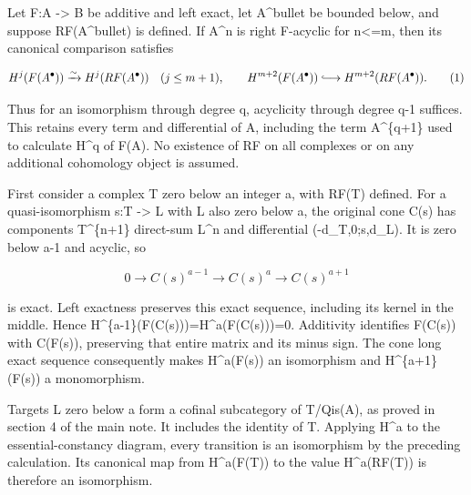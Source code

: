 \documentclass[11pt]{article}
\begin{document}
Let F:\allowbreak{}A \allowbreak{}-> B be additive and left exact,\allowbreak{} let A\^{}bullet be bounded below,\allowbreak{} and suppose RF(A\textasciicircum{}bullet)\allowbreak{} is defined. If A\^{}n is right F-acyclic for n<\allowbreak{}=m,\allowbreak{} then its canonical comparison satisfies

\[
 H^j(F(A^\bullet))\xrightarrow{\sim}H^j(RF(A^\bullet))
       \quad(j\le m+1),
 \qquad
 H^{m+2}(F(A^\bullet))\lhook\joinrel\longrightarrow
                                  H^{m+2}(RF(A^\bullet)).       \tag{1}
\]

Thus for an isomorphism through degree q,\allowbreak{} acyclicity through degree q-1 suffices. This retains every term and differential of A,\allowbreak{} including the term A\textasciicircum{}\{q\allowbreak{}+1\} used to calculate H\^{}q of F(A)\allowbreak{}. No existence of RF on all complexes or on any additional cohomology object is assumed.

First consider a complex T zero below an integer a,\allowbreak{} with RF(T)\allowbreak{} defined. For a quasi-isomorphism s:\allowbreak{}T \allowbreak{}-> L with L also zero below a,\allowbreak{} the original cone C(s)\allowbreak{} has components T\textasciicircum{}\{n\allowbreak{}+1\} direct-sum L\^{}n and differential (-d\_\allowbreak{}T,\allowbreak{}0;s,\allowbreak{}d\_\allowbreak{}L)\allowbreak{}. It is zero below a-1 and acyclic,\allowbreak{} so

\[
 0\longrightarrow C(s)^{a-1}\longrightarrow C(s)^a
                         \longrightarrow C(s)^{a+1}
\]

is exact. Left exactness preserves this exact sequence,\allowbreak{} including its kernel in the middle. Hence H\textasciicircum{}\{a-1\}(F(C(s)\allowbreak{})\allowbreak{})\allowbreak{}\allowbreak{}=H\textasciicircum{}a(F(C(s)\allowbreak{})\allowbreak{})\allowbreak{}\allowbreak{}=0. Additivity identifies F(C(s)\allowbreak{})\allowbreak{} with C(F(s)\allowbreak{})\allowbreak{},\allowbreak{} preserving that entire matrix and its minus sign. The cone long exact sequence consequently makes H\textasciicircum{}a(F(s)\allowbreak{})\allowbreak{} an isomorphism and H\textasciicircum{}\{a\allowbreak{}+1\}(F(s)\allowbreak{})\allowbreak{} a monomorphism.

Targets L zero below a form a cofinal subcategory of T/\allowbreak{}Qis(A)\allowbreak{},\allowbreak{} as proved in section 4 of the main note. It includes the identity of T. Applying H\^{}a to the essential-constancy diagram,\allowbreak{} every transition is an isomorphism by the preceding calculation. Its canonical map from H\textasciicircum{}a(F(T)\allowbreak{})\allowbreak{} to the value H\textasciicircum{}a(RF(T)\allowbreak{})\allowbreak{} is therefore an isomorphism.
\end{document}

